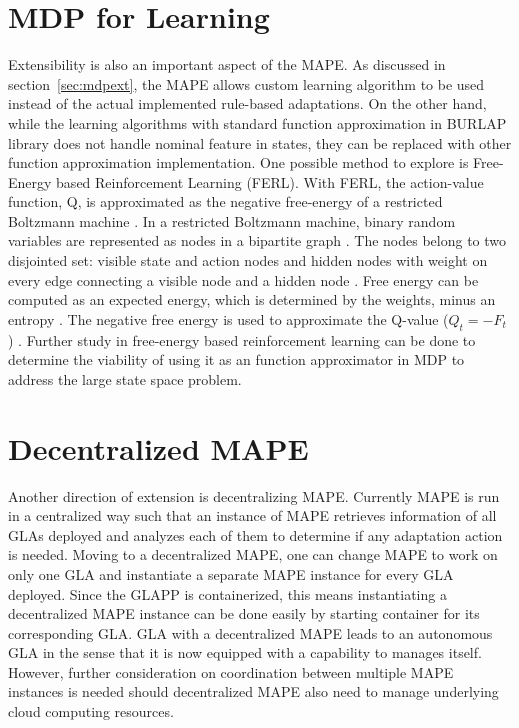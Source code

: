 \documentclass{seal_thesis}
\begin{document}
\section{MDP for Learning}
Extensibility is also an important aspect of the MAPE.
As discussed in section~\ref{sec:mdpext}, the MAPE allows custom learning algorithm to be used instead of the actual implemented rule-based adaptations.
On the other hand, while the learning algorithms with standard function approximation in BURLAP library does not handle nominal feature in states, they can be replaced with other function approximation implementation.
One possible method to explore is Free-Energy based Reinforcement Learning (FERL).
With FERL, the action-value function, Q, is approximated as the negative free-energy of a restricted Boltzmann machine \cite{sallans2004reinforcement}.
In a restricted Boltzmann machine, binary random variables are represented as nodes in a bipartite graph \cite{sallans2004reinforcement}.
The nodes belong to two disjointed set: visible state and action nodes and hidden nodes with weight on every edge connecting a visible node and a hidden node \cite{sallans2004reinforcement, 10.3389/fnbot.2013.00003}.
Free energy can be computed as an expected energy, which is determined by the weights, minus an entropy \cite{sallans2004reinforcement}.
The negative free energy is used to approximate the Q-value ($Q_t = -F_t$) \cite{sallans2004reinforcement, 10.3389/fnbot.2013.00003}.
Further study in free-energy based reinforcement learning can be done to determine the viability of using it as an function approximator in MDP to address the large state space problem.


\section{Decentralized MAPE}
Another direction of extension is decentralizing MAPE.
Currently MAPE is run in a centralized way such that an instance of MAPE retrieves information of all GLAs deployed and analyzes each of them to determine if any adaptation action is needed.
Moving to a decentralized MAPE, one can change MAPE to work on only one GLA and instantiate a separate MAPE instance for every GLA deployed.
Since the GLAPP is containerized, this means instantiating a decentralized MAPE instance can be done easily by starting container for its corresponding GLA.
GLA with a decentralized MAPE leads to an autonomous GLA in the sense that it is now equipped with a capability to manages itself.
However, further consideration on coordination between multiple MAPE instances is needed should decentralized MAPE also need to manage underlying cloud computing resources.
\end{document}
